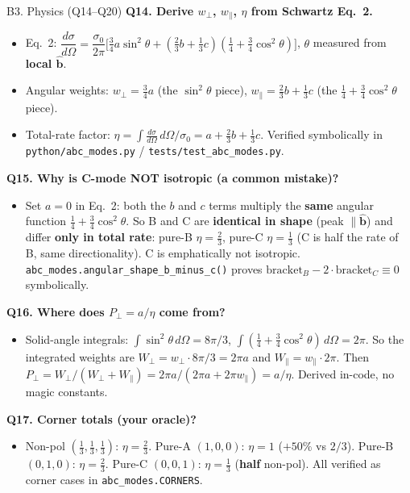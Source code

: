 \documentclass[11pt,aspectratio=169]{beamer}
\newcommand{\bhat}{\hat{\mathbf{b}}}
\newcommand{\qitem}[1]{\medskip\textbf{#1}\par}
\begin{document}
\begin{frame}[allowframebreaks]{B3. Physics (Q14--Q20)}
\small
\qitem{Q14. Derive $w_\perp$, $w_\parallel$, $\eta$ from Schwartz Eq.~2.}
\begin{itemize}
\item Eq.~2:
      $\dfrac{d\sigma}{d\Omega} = \dfrac{\sigma_0}{2\pi}\big[\tfrac34 a\sin^2\theta
      + (\tfrac23 b + \tfrac13 c)(\tfrac14 + \tfrac34\cos^2\theta)\big]$,
      $\theta$ measured from \textbf{local $\bhat$}.
\item Angular weights: $w_\perp = \tfrac34 a$ (the $\sin^2\theta$ piece),
      $w_\parallel = \tfrac23 b + \tfrac13 c$ (the $\tfrac14 + \tfrac34\cos^2\theta$ piece).
\item Total-rate factor:
      $\eta = \int \tfrac{d\sigma}{d\Omega}\, d\Omega / \sigma_0 = a + \tfrac23 b + \tfrac13 c$.
      Verified symbolically in \texttt{python/abc\_modes.py} /
      \texttt{tests/test\_abc\_modes.py}.
\end{itemize}

\qitem{Q15. Why is C-mode NOT isotropic (a common mistake)?}
\begin{itemize}
\item Set $a=0$ in Eq.~2: both the $b$ and $c$ terms multiply the \textbf{same} angular
      function $\tfrac14 + \tfrac34\cos^2\theta$. So B and C are \textbf{identical in shape}
      (peak $\parallel \bhat$) and differ \textbf{only in total rate}: pure-B $\eta = \tfrac23$,
      pure-C $\eta = \tfrac13$ (C is half the rate of B, same directionality). C is
      emphatically not isotropic. \texttt{abc\_modes.angular\_shape\_b\_minus\_c()} proves
      $\text{bracket}_B - 2\cdot\text{bracket}_C \equiv 0$ symbolically.
\end{itemize}

\framebreak
\qitem{Q16. Where does $P_\perp = a/\eta$ come from?}
\begin{itemize}
\item Solid-angle integrals: $\int \sin^2\theta\, d\Omega = 8\pi/3$,
      $\int(\tfrac14 + \tfrac34\cos^2\theta)\, d\Omega = 2\pi$. So the integrated weights are
      $W_\perp = w_\perp \cdot 8\pi/3 = 2\pi a$ and $W_\parallel = w_\parallel \cdot 2\pi$.
      Then $P_\perp = W_\perp/(W_\perp + W_\parallel) = 2\pi a/(2\pi a + 2\pi w_\parallel)
      = a/\eta$. Derived in-code, no magic constants.
\end{itemize}

\qitem{Q17. Corner totals (your oracle)?}
\begin{itemize}
\item Non-pol $(\tfrac13,\tfrac13,\tfrac13)$: $\eta = \tfrac23$. Pure-A $(1,0,0)$: $\eta = 1$
      (\textbf{$+50\%$} vs $2/3$). Pure-B $(0,1,0)$: $\eta = \tfrac23$. Pure-C $(0,0,1)$:
      $\eta = \tfrac13$ (\textbf{half} non-pol). All verified as corner cases in
      \texttt{abc\_modes.CORNERS}.
\end{itemize}


\end{frame}
\end{document}
